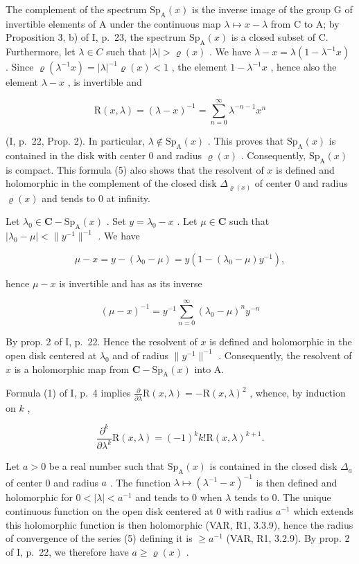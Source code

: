 The complement of the spectrum \(\mathrm{Sp}_{\mathrm{A}}(x)\) is the inverse image of the group G of invertible elements of A under the continuous map \(\lambda \mapsto x - \lambda\) from C to A; by Proposition 3, b) of I, p.~23, the spectrum \(\mathrm{Sp}_{\mathrm{A}}(x)\) is a closed subset of C. Furthermore, let \(\lambda \in C\) such that \(|\lambda| > \varrho(x)\) . We have \(\lambda - x = \lambda(1 - \lambda^{-1}x)\) . Since \(\varrho(\lambda^{-1}x) = |\lambda|^{-1}\varrho(x) < 1\) , the element \(1 - \lambda^{-1}x\) , hence also the element \(\lambda - x\) , is invertible and

\[
\mathrm{R} (x, \lambda) = (\lambda - x) ^ {- 1} = \sum_ {n = 0} ^ {\infty} \lambda^ {- n - 1} x ^ {n}\tag{5}
\]

(I, p.~22, Prop. 2). In particular, \(\lambda \notin \mathrm{Sp}_{\mathrm{A}}(x)\) . This proves that \(\mathrm{Sp}_{\mathrm{A}}(x)\) is contained in the disk with center 0 and radius \(\varrho(x)\) . Consequently, \(\mathrm{Sp}_{\mathrm{A}}(x)\) is compact. This formula (5) also shows that the resolvent of \(x\) is defined and holomorphic in the complement of the closed disk \(\Delta_{\varrho(x)}\) of center 0 and radius \(\varrho(x)\) and tends to 0 at infinity.

Let \(\lambda_0\in \mathbf{C} - \mathrm{Sp}_{\mathrm{A}}(x)\) . Set \(y = \lambda_0 - x\) . Let \(\mu \in \mathbf{C}\) such that \(|\lambda_0 - \mu | < \| y^{-1}\|^{-1}\) . We have

\[
\mu - x = y - (\lambda_ {0} - \mu) = y (1 - (\lambda_ {0} - \mu) y ^ {- 1}),
\]

hence \(\mu - x\) is invertible and has as its inverse

\[
(\mu - x) ^ {- 1} = y ^ {- 1} \sum_ {n = 0} ^ {\infty} (\lambda_ {0} - \mu) ^ {n} y ^ {- n}\tag{6}
\]

By prop. 2 of I, p.~22. Hence the resolvent of \(x\) is defined and holomorphic in the open disk centered at \(\lambda_0\) and of radius \(\| y^{-1} \|^{-1}\) . Consequently, the resolvent of \(x\) is a holomorphic map from \(\mathbf{C} - \mathrm{Sp}_{\mathrm{A}}(x)\) into A.

Formula (1) of I, p.~4 implies \(\frac{\partial}{\partial\lambda}\mathrm{R}(x,\lambda) = -\mathrm{R}(x,\lambda)^2\) , whence, by induction on \(k\) ,

\[
\frac {\partial^ {k}}{\partial \lambda^ {k}} \mathrm{R} (x, \lambda) = (- 1) ^ {k} k! \mathrm{R} (x, \lambda) ^ {k + 1}.
\]

Let \(a > 0\) be a real number such that \(\mathrm{Sp}_{\mathrm{A}}(x)\) is contained in the closed disk \(\Delta_{a}\) of center 0 and radius \(a\) . The function \(\lambda \mapsto (\lambda^{-1} - x)^{-1}\) is then defined and holomorphic for \(0 < |\lambda| < a^{-1}\) and tends to 0 when \(\lambda\) tends to 0. The unique continuous function on the open disk centered at 0 with radius \(a^{-1}\) which extends this holomorphic function is then holomorphic (VAR, R1, 3.3.9), hence the radius of convergence of the series (5) defining it is \(\geqslant a^{-1}\) (VAR, R1, 3.2.9). By prop. 2 of I, p.~22, we therefore have \(a \geqslant \varrho(x)\) .

